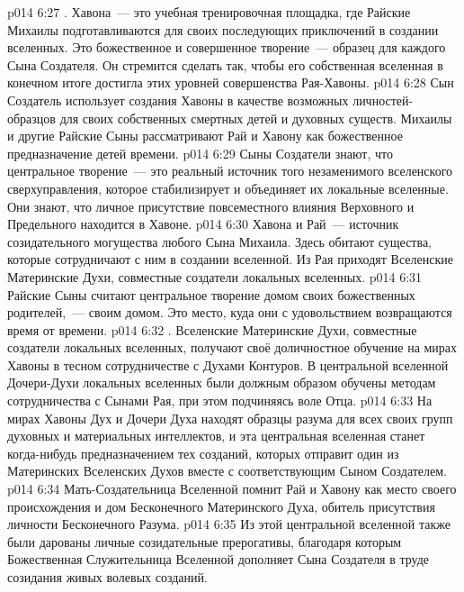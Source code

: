 \vs p014 6:27 . Хавона~--- это учебная тренировочная площадка, где Райские Михаилы подготавливаются для своих последующих приключений в создании вселенных. Это божественное и совершенное творение~--- образец для каждого Сына Создателя. Он стремится сделать так, чтобы его собственная вселенная в конечном итоге достигла этих уровней совершенства Рая\hyp{}Хавоны.
\vs p014 6:28 Сын Создатель использует создания Хавоны в качестве возможных личностей\hyp{}образцов для своих собственных смертных детей и духовных существ. Михаилы и другие Райские Сыны рассматривают Рай и Хавону как божественное предназначение детей времени.
\vs p014 6:29 Сыны Создатели знают, что центральное творение~--- это реальный источник того незаменимого вселенского сверхуправления, которое стабилизирует и объединяет их локальные вселенные. Они знают, что личное присутствие повсеместного влияния Верховного и Предельного находится в Хавоне.
\vs p014 6:30 Хавона и Рай~--- источник созидательного могущества любого Сына Михаила. Здесь обитают существа, которые сотрудничают с ним в создании вселенной. Из Рая приходят Вселенские Материнские Духи, совместные создатели локальных вселенных.
\vs p014 6:31 Райские Сыны считают центральное творение домом своих божественных родителей,~--- своим домом. Это место, куда они с удовольствием возвращаются время от времени.
\vs p014 6:32 . Вселенские Материнские Духи, совместные создатели локальных вселенных, получают своё доличностное обучение на мирах Хавоны в тесном сотрудничестве с Духами Контуров. В центральной вселенной Дочери\hyp{}Духи локальных вселенных были должным образом обучены методам сотрудничества с Сынами Рая, при этом подчиняясь воле Отца.
\vs p014 6:33 На мирах Хавоны Дух и Дочери Духа находят образцы разума для всех своих групп духовных и материальных интеллектов, и эта центральная вселенная станет когда\hyp{}нибудь предназначением тех созданий, которых отправит один из Материнских Вселенских Духов вместе с соответствующим Сыном Создателем.
\vs p014 6:34 Мать\hyp{}Создательница Вселенной помнит Рай и Хавону как место своего происхождения и дом Бесконечного Материнского Духа, обитель присутствия личности Бесконечного Разума.
\vs p014 6:35 Из этой центральной вселенной также были дарованы личные созидательные прерогативы, благодаря которым Божественная Служительница Вселенной дополняет Сына Создателя в труде созидания живых волевых созданий.
